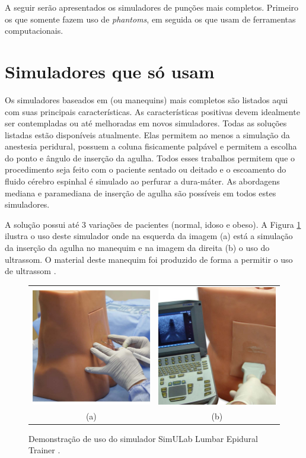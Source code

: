 A seguir serão apresentados os simuladores de punções mais completos. Primeiro os que somente fazem uso de \textit{phantoms}, em seguida os que usam de ferramentas computacionais.  

\section{Simuladores que só usam } \label{sec:SimuladoresPhantoms}

Os simuladores baseados em  (ou manequins) mais completos são listados aqui com suas principais características. As características positivas devem idealmente ser contempladas ou até melhoradas em novos simuladores. Todas as soluções listadas estão disponíveis atualmente. Elas permitem ao menos a simulação da anestesia peridural, possuem a coluna fisicamente palpável e permitem a escolha do ponto e ângulo de inserção da agulha. Todos esses trabalhos permitem que o procedimento seja feito com o paciente sentado ou deitado e o escoamento do fluido cérebro espinhal é simulado ao perfurar a dura-máter. As abordagens mediana e paramediana de inserção de agulha são possíveis em todos estes simuladores.

A solução  possui até 3 variações de pacientes (normal, idoso e obeso). A Figura \ref{fig:simuladorSimulab} ilustra o uso deste simulador onde na esquerda da imagem (a) está a simulação da inserção da agulha no manequim e na imagem da direita (b) o uso do ultrassom. O material deste manequim foi produzido de forma a permitir o uso de ultrassom \cite{SimulabCorporation2008}. 

\begin{figure}[ht!]
    \centering
        \begin{tabular}{cc}
        \includegraphics[width=0.3\linewidth]{capitulos/figuras/simulab-insercao-agulha.jpg} & 
        \includegraphics[width=0.3\linewidth]{capitulos/figuras/simulab-ultrassom.jpg} 
        \\
        (a) & (b)
        \end{tabular}
    \caption{Demonstração de uso do simulador SimULab Lumbar Epidural Trainer \cite{SimulabCorporation2008}.}
    \label{fig:simuladorSimulab}
\end{figure}

